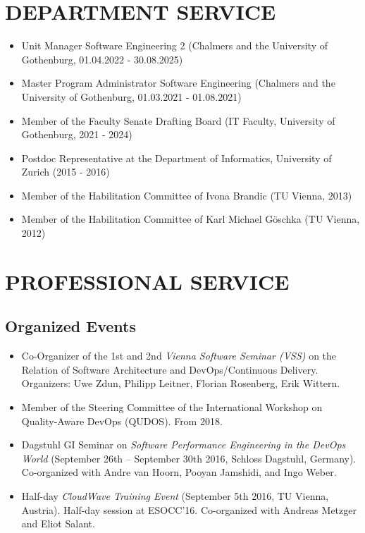 \documentclass[paper=letter,fontsize=11pt]{scrartcl} %
\newcommand{\NewPart}[2]{\section*{\uppercase{#1} #2}}
\begin{document}
\NewPart{Department Service}{}
\begin{itemize}
\item Unit Manager Software Engineering 2 (Chalmers and the University of Gothenburg, 01.04.2022 - 30.08.2025)  
\item Master Program Administrator Software Engineering (Chalmers and the University of Gothenburg, 01.03.2021 - 01.08.2021)
\item Member of the Faculty Senate Drafting Board (IT Faculty, University of Gothenburg, 2021 - 2024)
\item Postdoc Representative at the Department of Informatics, University of Zurich (2015 - 2016)
\item Member of the Habilitation Committee of Ivona Brandic (TU Vienna, 2013)
\item Member of the Habilitation Committee of Karl Michael G\"oschka (TU Vienna, 2012)
\end{itemize}

\NewPart{Professional Service}{}

\subsection*{Organized Events}
\begin{itemize}
\item Co-Organizer of the 1st and 2nd \emph{Vienna Software Seminar (VSS)} on the Relation of Software Architecture and DevOps/Continuous Delivery. Organizers: Uwe Zdun, Philipp Leitner, Florian Rosenberg, Erik Wittern.
\item Member of the Steering Committee of the International Workshop on Quality-Aware DevOps (QUDOS). From 2018.
\item Dagstuhl GI Seminar on \emph{Software Performance Engineering in the DevOps World} (September 26th – September 30th 2016, Schloss Dagstuhl, Germany). Co-organized with Andre van Hoorn, Pooyan Jamshidi, and Ingo Weber.
\item Half-day \emph{CloudWave Training Event} (September 5th 2016, TU Vienna, Austria). Half-day session at ESOCC'16. Co-organized with Andreas Metzger and Eliot Salant.
\end{itemize}
\end{document}
